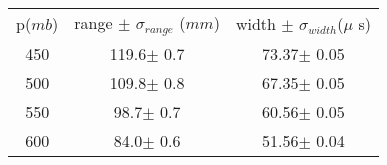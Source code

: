 
\begin{center}
\begin{tabulary}{\textwidth}{CCC}
\toprule
p($mb$)& range $\pm$ $\sigma_{range}$ ($mm$) &  width $\pm$ $\sigma_{width}$($\mu$ s)\\
450&	119.6$\pm$	0.7&	73.37$\pm$	0.05\\
500&	109.8$\pm$	0.8&	67.35$\pm$	0.05\\
550&	98.7$\pm$	0.7&	60.56$\pm$	0.05\\
600&	84.0$\pm$	0.6&	51.56$\pm$	0.04\\
\bottomrule
\end{tabulary}
\end{center}
